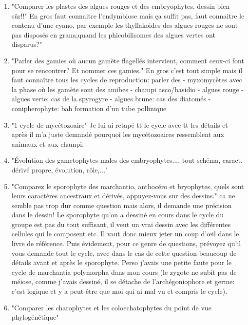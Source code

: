 \begin{enumerate}
	\item "Comparer les plastes des algues rouges et des embryophytes. dessin bien sûr!!"
En gros faut connaitre l’endymbiose mais ça suffit pas, faut connaitre le contenu d’une
cyano, par exemple les thyllakoides des algues rouges ne sont pas disposés en grana;quand les phicobilisomes des algues vertes ont disparus?"

	\item "Parler des gamies où aucun gamète flagellés intervient, comment ceux-ci font pour se rencontrer? Et nommer ces gamies." En gros c'est tout simple mais il faut connaître tous les cycles de reproduction: parler des
- myxomycètes avec la phase où les gamète sont des amibes
- champi asco/basidio
- algues rouge
- algues verte: cas de la spyrogyre
- algues brune: cas des diatomés
- conipherophyte: bah formation d’un tube pollinique

	\item "1 cycle de mycétozoaire"
 Je lui ai retapé tt le cycle avec tt les détails et après il m'a juste demandé pourquoi les mycétozoaires ressemblent aux animaux et aux champi.

	\item "Évolution des gametophytes males des embryophytes.... tout schéma, caract. dérivé propre, évolution, rôle,..."

	\item "Comparez le sporophyte des marchantio, anthocéro et bryophytes, quels sont leurs caractères ancestraux et dérivés, appuyez-vous sur des dessins."
ca ne semble pas trop dur comme question mais alors, il demande une précision dans le dessin! Le sporophyte qu’on a dessiné en cours dans le cycle du groupe est pas du tout suffisant, il veut un vrai dessin avec les différentes cellules qui le composent etc. Il vaut donc mieux jeter un coup d'œil dans le livre de référence. Puis évidement, pour ce genre de questions, prévoyez qu'il vous demande tout le cycle, avec dans le cas de cette question beaucoup de détails avant et après le sporophyte. Perso j'avais une petite faute pour le cycle de marchantia polymorpha dans mon cours (le zygote ne subit pas de méiose, comme j'avais dessiné, il se détache de l'archégoniophore et germe: c'est logique et y a peut-être que moi qui ai mal vu et compris le cycle).

	\item "Comparer les charophytes et les coloechatophytes du point de vue phylogénétique"
\end{enumerate}